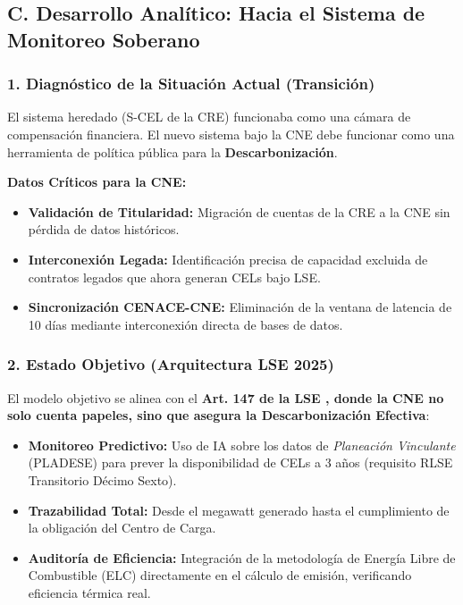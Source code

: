 \documentclass{cel}
\begin{document}
\subsection{C. Desarrollo Analítico: Hacia el Sistema de Monitoreo Soberano}
\nopagebreak

\subsubsection{1. Diagnóstico de la Situación Actual (Transición)}
\nopagebreak

El sistema heredado (S-CEL de la CRE) funcionaba como una cámara de compensación financiera. El nuevo sistema bajo la CNE debe funcionar como una herramienta de política pública para la \textbf{Descarbonización}.


\textbf{Datos Críticos para la CNE:}


\begin{itemize}
\item \textbf{Validación de Titularidad:} Migración de cuentas de la CRE a la CNE sin pérdida de datos históricos.
\item \textbf{Interconexión Legada:} Identificación precisa de capacidad excluida de contratos legados que ahora generan CELs bajo LSE.
\item \textbf{Sincronización CENACE-CNE:} Eliminación de la ventana de latencia de 10 días mediante interconexión directa de bases de datos.

\end{itemize}
\subsubsection{2. Estado Objetivo (Arquitectura LSE 2025)}
\nopagebreak

El modelo objetivo se alinea con el \textbf{Art. 147 de la LSE \textbf{, donde la CNE no solo \textquotedbl{}cuenta papeles\textquotedbl{}, sino que asegura la }Descarbonización Efectiva}:


\begin{itemize}
\item \textbf{Monitoreo Predictivo:} Uso de IA sobre los datos de \textit{Planeación Vinculante} (PLADESE) para prever la disponibilidad de CELs a 3 años (requisito RLSE Transitorio Décimo Sexto).
\item \textbf{Trazabilidad Total:} Desde el megawatt generado hasta el cumplimiento de la obligación del Centro de Carga.
\item \textbf{Auditoría de Eficiencia:} Integración de la metodología de Energía Libre de Combustible (ELC) directamente en el cálculo de emisión, verificando eficiencia térmica real.

\end{itemize}
\vspace{0.4cm}
\end{document}
